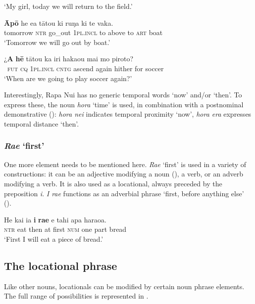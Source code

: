 \glt 
‘My girl, today we will return to the field.’ \textstyleExampleref{[R235.038]} 
\z

\ea\label{ex:3.176}
\gll \textbf{Āpō} he e{\ꞌ}a tātou ki ruŋa ki te vaka. \\
tomorrow \textsc{ntr} go\_out \textsc{1pl.incl} to above to \textsc{art} boat \\

\glt 
‘Tomorrow we will go out by boat.’ \textstyleExampleref{[R368.045]} 
\z

\ea\label{ex:3.177}
\gll ¿\textbf{A} \textbf{hē} tātou ka iri haka{\ꞌ}ou mai mo piroto? \\
~\textsc{fut} \textsc{cq} \textsc{1pl.incl} \textsc{cntg} ascend again hither for soccer \\

\glt
‘When are we going to play soccer again?’ \textstyleExampleref{[R155.007]} 
\z

Interestingly, Rapa Nui has no generic temporal words ‘now’ and/or ‘then’. To express these, the noun \textit{hora} ‘time’ is used, in combination with a postnominal demonstrative (): \textit{hora nei} indicates temporal proximity ‘now’, \textit{hora era} expresses temporal distance ‘then’.

\subsubsection{\textit{Ra{\ꞌ}e} ‘first’}\label{sec:3.6.4.1}
One more element needs to be mentioned here. \textit{Ra{\ꞌ}e} ‘first’ is used in a variety of constructions: it can be an adjective modifying a noun (), a verb, or an adverb modifying a verb. It is also used as a locational, always preceded by the preposition \textit{{\ꞌ}i}. \textit{{\ꞌ}I ra{\ꞌ}e} functions as an adverbial phrase ‘first, before anything else’ ().

\ea\label{ex:3.178}
\gll He kai ia \textbf{{\ꞌ}i} \textbf{ra{\ꞌ}e} e tahi {\ꞌ}apa haraoa.\\
\textsc{ntr} eat then at first \textsc{num} one part bread\\

\glt 
‘First I will eat a piece of bread.’ \textstyleExampleref{[R476.031]}  
\z

\subsection{The locational phrase}\label{sec:3.6.5}
Like other nouns, locationals can be modified by certain noun phrase elements. The full range of possibilities is represented in .

